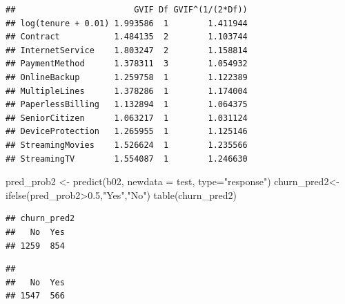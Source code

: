 \documentclass[
  twoside]{article}
\newenvironment{Shaded}{\begin{snugshade}}{\end{snugshade}}
\newcommand{\AttributeTok}[1]{\textcolor[rgb]{0.77,0.63,0.00}{#1}}
\newcommand{\CommentTok}[1]{\textcolor[rgb]{0.56,0.35,0.01}{\textit{#1}}}
\newcommand{\FloatTok}[1]{\textcolor[rgb]{0.00,0.00,0.81}{#1}}
\newcommand{\FunctionTok}[1]{\textcolor[rgb]{0.00,0.00,0.00}{#1}}
\newcommand{\NormalTok}[1]{#1}
\newcommand{\OtherTok}[1]{\textcolor[rgb]{0.56,0.35,0.01}{#1}}
\newcommand{\SpecialCharTok}[1]{\textcolor[rgb]{0.00,0.00,0.00}{#1}}
\newcommand{\StringTok}[1]{\textcolor[rgb]{0.31,0.60,0.02}{#1}}
\begin{document}
\begin{verbatim}
##                        GVIF Df GVIF^(1/(2*Df))
## log(tenure + 0.01) 1.993586  1        1.411944
## Contract           1.484135  2        1.103744
## InternetService    1.803247  2        1.158814
## PaymentMethod      1.378311  3        1.054932
## OnlineBackup       1.259758  1        1.122389
## MultipleLines      1.378286  1        1.174004
## PaperlessBilling   1.132894  1        1.064375
## SeniorCitizen      1.063217  1        1.031124
## DeviceProtection   1.265955  1        1.125146
## StreamingMovies    1.526624  1        1.235566
## StreamingTV        1.554087  1        1.246630
\end{verbatim}

\begin{Shaded}
\begin{Highlighting}[]
\NormalTok{pred\_prob2 }\OtherTok{\textless{}{-}} \FunctionTok{predict}\NormalTok{(b02, }\AttributeTok{newdata =}\NormalTok{ test, }\AttributeTok{type=}\StringTok{"response"}\NormalTok{)}
\NormalTok{churn\_pred2}\OtherTok{\textless{}{-}} \FunctionTok{ifelse}\NormalTok{(pred\_prob2}\SpecialCharTok{\textgreater{}}\FloatTok{0.5}\NormalTok{,}\StringTok{"Yes"}\NormalTok{,}\StringTok{"No"}\NormalTok{)}
\FunctionTok{table}\NormalTok{(churn\_pred2)}
\end{Highlighting}
\end{Shaded}

\begin{verbatim}
## churn_pred2
##   No  Yes 
## 1259  854
\end{verbatim}

\begin{Shaded}
\end{Shaded}

\begin{verbatim}
## 
##   No  Yes 
## 1547  566
\end{verbatim}

\begin{Shaded}
\end{Shaded}
\end{document}
